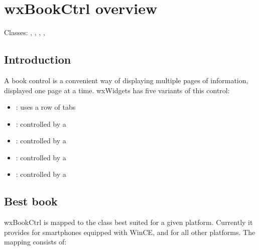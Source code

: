 
\section{wxBookCtrl overview}\label{wxbookctrloverview}

Classes: , , , 
, 

\subsection{Introduction}\label{wxbookctrlintro}

A book control is a convenient way of displaying multiple pages of information,
displayed one page at a time. wxWidgets has five variants of this control:

\begin{itemize}\itemsep=0pt
\item {}: uses a row of tabs
\item {}: controlled by a 
\item {}: controlled by a 
\item {}: controlled by a 
\item {}: controlled by a 
\end{itemize}

\subsection{Best book}\label{wxbestbookctrl}

wxBookCtrl is mapped to the class best suited for a given platform.
Currently it provides  for smartphones equipped with
WinCE, and  for all other platforms. The mapping consists of:

